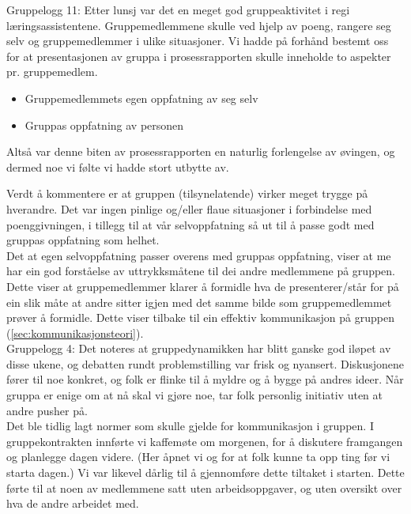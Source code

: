 Gruppelogg 11:
Etter lunsj var det en meget god gruppeaktivitet i regi læringsassistentene.
Gruppemedlemmene skulle ved hjelp av poeng, rangere seg selv og gruppemedlemmer
i ulike situasjoner. Vi hadde på forhånd bestemt oss for at presentasjonen av
gruppa i prosessrapporten skulle inneholde to aspekter pr. gruppemedlem.
\begin{itemize}
\item Gruppemedlemmets egen oppfatning av seg selv
\item Gruppas oppfatning av personen
\end{itemize}
Altså var denne biten av prosessrapporten en naturlig forlengelse av øvingen, og
dermed noe vi følte vi hadde stort utbytte av.

Verdt å kommentere er at gruppen (tilsynelatende) virker meget trygge på hverandre.
Det var ingen pinlige og/eller flaue situasjoner i forbindelse med
poenggivningen, i tillegg til at vår selvoppfatning så ut til å passe godt med
gruppas oppfatning som helhet.\\

Det at egen selvoppfatning passer overens med gruppas oppfatning, viser at me har ein god
forståelse av uttrykksmåtene til dei andre medlemmene på gruppen. Dette viser at gruppemedlemmer
klarer å formidle hva de presenterer/står for på ein slik måte at andre sitter igjen med det samme bilde 
som gruppemedlemmet prøver å formidle. Dette viser tilbake til ein effektiv kommunikasjon på gruppen 
(\ref{sec:kommunikasjonsteori}).\\

Gruppelogg 4:
Det noteres at gruppedynamikken har blitt ganske god iløpet av disse ukene, og
debatten rundt problemstilling var frisk og nyansert. Diskusjonene fører til noe
konkret, og folk er flinke til å myldre og å bygge på andres ideer. Når gruppa
er enige om at nå skal vi gjøre noe, tar folk personlig initiativ uten at andre
pusher på.\\
Det ble tidlig lagt normer som skulle gjelde for kommunikasjon i gruppen. I gruppekontrakten innførte vi kaffemøte om morgenen, 
for å diskutere framgangen og planlegge dagen videre. (Her åpnet vi og for at folk kunne ta opp ting før vi starta dagen.) 
Vi var likevel dårlig til å gjennomføre dette tiltaket i starten. Dette førte til at noen av medlemmene satt uten arbeidsoppgaver,
 og uten oversikt over hva de andre arbeidet med. \\

